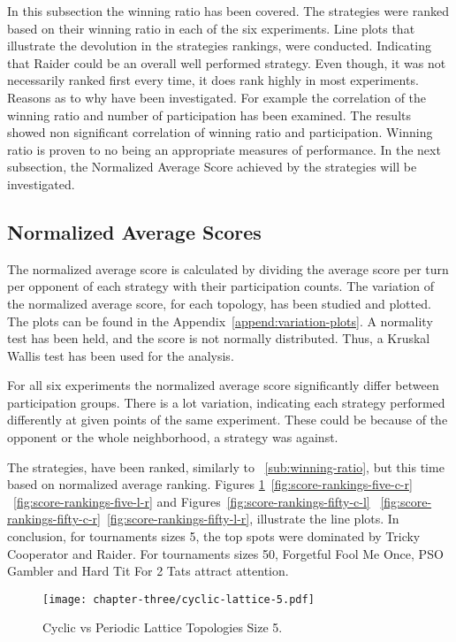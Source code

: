 In this subsection the winning ratio has been covered. The strategies were ranked
based on their winning ratio in each of the
six experiments. Line plots that illustrate the devolution in the strategies
rankings, were conducted. Indicating that Raider could be an overall well performed
strategy. Even though, it was not necessarily ranked first every time,
it does rank highly in most experiments. Reasons as to why have been investigated.
For example the correlation
of the winning ratio and number of participation has been examined. The results
showed non significant correlation of winning ratio and participation. Winning
ratio is proven to no being an appropriate measures of performance.
In the next subsection, the Normalized Average Score achieved by the strategies
will be investigated.

\subsection{Normalized Average Scores}
\label{sub:normalized_av_score}

The normalized average score is calculated by dividing the average score per
turn per opponent of each strategy with their participation counts. The variation
of the normalized average score, for each topology, has been studied and plotted.
The plots can be found in the Appendix~\ref{append:variation-plots}. A normality
test has been held, and the score is not normally distributed. Thus, a Kruskal
Wallis test has been used for the analysis.

For all six experiments the normalized average score significantly differ between
participation groups. There is a lot variation, indicating each strategy performed
differently at given points of the same experiment. These could be because of the
opponent or the whole neighborhood, a strategy was against.

The strategies, have been ranked, similarly to ~\ref{sub:winning-ratio}, but
this time based on normalized average ranking. Figures \ref{fig:score-rankings-five-c-l}~\ref{fig:score-rankings-five-c-r}
~\ref{fig:score-rankings-five-l-r} and Figures~\ref{fig:score-rankings-fifty-c-l}
~\ref{fig:score-rankings-fifty-c-r}~\ref{fig:score-rankings-fifty-l-r}, illustrate
the line plots. In conclusion, for tournaments sizes 5, the top spots were dominated
by Tricky Cooperator and Raider. For tournaments sizes 50, Forgetful Fool Me Once,
PSO Gambler and Hard Tit For 2 Tats attract attention.

\begin{figure}[H]
	\centering
	\texttt{[image: chapter-three/cyclic-lattice-5.pdf]}
	\caption{Cyclic vs Periodic Lattice Topologies Size 5.}
	\label{fig:score-rankings-five-c-l}
\end{figure}

